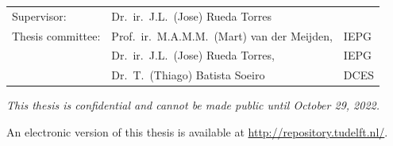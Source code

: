 \begin{titlepage}
\begin{center}
\begin{tabular}{lll}
    Supervisor: & Dr.\ ir.\ J.L.\ (Jose) Rueda Torres \\
    Thesis committee:
        & Prof.\ ir.\ M.A.M.M.\ (Mart) van der Meijden, & IEPG\\
        & Dr.\ ir.\ J.L.\ (Jose) Rueda Torres, & IEPG  \\
        & Dr.\ T.\ (Thiago) Batista Soeiro & DCES \\
        
\end{tabular}

\vspace{35mm}
\bigskip
\emph{This thesis is confidential and cannot be made public until October 29, 2022.}

\bigskip

An electronic version of this thesis is available at \url{http://repository.tudelft.nl/}.
\vspace{15mm}
\end{center}

\end{titlepage}

